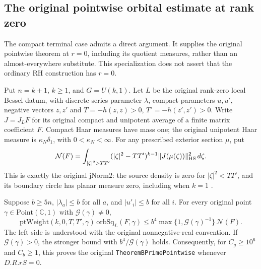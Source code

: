 \subsection{The original pointwise orbital estimate at rank zero}
\label{rank-zero-pointwise}

The compact terminal case admits a direct argument.  It supplies the
original pointwise theorem at $r=0$, including its quotient measures,
rather than an almost-everywhere substitute.  This specialization does
not assert that the ordinary RH construction has $r=0$.

Put $n=k+1$, $k\ge1$, and $G=U(k,1)$.  Let $L$ be the original
rank-zero local Bessel datum, with discrete-series parameter $\lambda$,
compact parameters $u,u'$, negative vectors $z,z'$ and
$T=-h(z,z)>0$, $T'=-h(z',z')>0$.  Write $J=J_LF$ for its original
compact and unipotent average of a finite matrix coefficient $F$.
Compact Haar measures have mass one; the original unipotent Haar
measure is $\kappa_N\delta_1$, with $0<\kappa_N<\infty$.
For any prescribed exterior section $\mu$, put
\begin{equation}\label{rank-zero-original-norm}
 \mathcal N(F)=\int_{|\zeta|^2>TT'}
       (|\zeta|^2-TT')^{k-1}\|J(\mu(\zeta))\|_{\rm HS}^2\,d\zeta.
\end{equation}
This is exactly the original $\mathrm{jNorm2}$: the source density
is zero for $|\zeta|^2<TT'$, and its boundary circle has planar
measure zero, including when $k=1$ \cite{rank-zero-pointwise-source}.

\begin{theorem}\label{rank-zero-original-pointwise}
Suppose $b\ge5n$, $|\lambda_a|\le b$ for all $a$, and
$|u'_i|\le b$ for all $i$.  For every original point
$\gamma\in\mathrm{Point}(\mathbb C,1)$ with
$\mathcal G(\gamma)\ne0$,
\begin{equation}\label{rank-zero-orbital-bound}
 \mathrm{ptWeight}(k,0,T,T',\gamma)\,
       \mathrm{orbSq}_L(F,\gamma)
 \le b^4\max\{1,\mathcal G(\gamma)^{-1}\}\,\mathcal N(F).
\end{equation}
The left side is understood with the original nonnegative-real
convention.  If $\mathcal G(\gamma)>0$, the stronger bound with
$b^4/\mathcal G(\gamma)$ holds.  Consequently, for $C_g\ge10^6$
and $C_b\ge1$, this proves the original
\texttt{TheoremBPrimePointwise} whenever $D.R.rS=0$.
\end{theorem}

